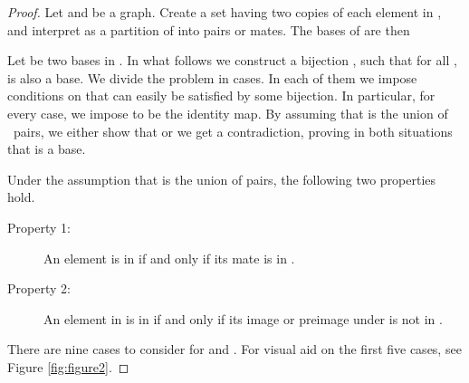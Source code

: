 \documentclass[letterpaper,11pt]{article}
\theoremstyle{definition}
\begin{document}
\begin{proof}
Let  and  be a graph. Create a set  having two copies of each element in , and interpret  as a partition of  into pairs or mates. The bases of  are then


Let  be two bases in . In what follows we construct a bijection , such that for all ,  is also a base. We divide the problem in cases. In each of them we impose conditions on  that can easily be satisfied by some bijection. In particular, for every case, we impose  to be the identity map. By assuming that  is the union of ~pairs, we either show that  or we get a contradiction, proving in both situations that  is a base.

Under the assumption that  is the union of  pairs, the following two properties hold.
\begin{description}
\item[Property 1:] An element is in  if and only if its mate is in .
\item[Property 2:] An element in  is in  if and only if its image or preimage under  is not in .
\end{description}

There are nine cases to consider for  and . For visual aid on the first five cases, see Figure \ref{fig:figure2}.


\end{proof}
\end{document}

